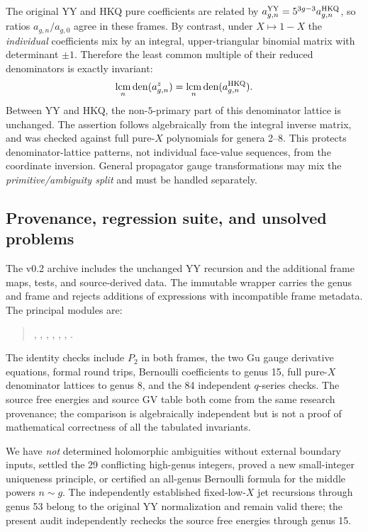 The original YY and HKQ pure coefficients are related by
$a_{g,n}^{\rm YY}=5^{3g-3}a_{g,n}^{\rm HKQ}$, so ratios
$a_{g,n}/a_{g,0}$ agree in these frames. By contrast, under $X\mapsto1-X$
the \emph{individual} coefficients mix by an integral, upper-triangular
binomial matrix with determinant $\pm1$. Therefore the least common
multiple of their reduced denominators is exactly invariant:
\begin{equation}\label{eq:2026lcd}
 \mathop{\rm lcm}_n\operatorname{den}(a_{g,n}^{z})
 =\mathop{\rm lcm}_n\operatorname{den}(a_{g,n}^{\rm HKQ}).
\end{equation}
Between YY and HKQ, the non-$5$-primary part of this denominator lattice
is unchanged. The assertion follows algebraically from the integral
inverse matrix, and was checked against full pure-$X$ polynomials for
genera 2--8. This protects denominator-lattice patterns, not individual
face-value sequences, from the coordinate inversion. General propagator
gauge transformations may mix the \emph{primitive/ambiguity split} and
must be handled separately.

\subsection{Provenance, regression suite, and unsolved problems}
The v0.2 archive includes the unchanged YY recursion and the additional
frame maps, tests, and source-derived data. The immutable
 wrapper carries the genus and frame and rejects
additions of expressions with incompatible frame metadata. The principal modules are:
\begin{quote}\small\raggedright
{}, ,
, ,
, ,
.
\end{quote}
The identity checks include $P_2$ in both frames, the two Gu gauge
derivative equations, formal round trips, Bernoulli coefficients to genus
15, full pure-$X$ denominator lattices to genus 8, and the 84 independent
$q$-series checks. The source free energies and source GV table both come
from the same research provenance; the comparison is algebraically independent
but is not a proof of mathematical correctness of all the tabulated invariants.

We have \emph{not} determined holomorphic ambiguities without external
boundary inputs, settled the 29 conflicting high-genus integers, proved a
new small-integer uniqueness principle, or certified an all-genus Bernoulli
formula for the middle powers $n\sim g$. The independently established
fixed-low-$X$ jet recursions through genus 53 belong to the original YY
normalization and remain valid there; the present audit independently
rechecks the source free energies through genus 15.

